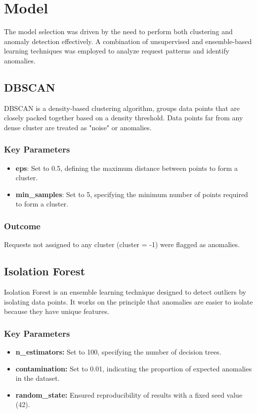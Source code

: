 \section{Model}
The model selection was driven by the need to perform both clustering and anomaly detection effectively. A combination of unsupervised and ensemble-based learning techniques was employed to analyze request patterns and identify anomalies.

\subsection{DBSCAN}
DBSCAN is a density-based clustering algorithm, groups data points that are closely packed together based on a density threshold. Data points far from any dense cluster are treated as "noise" or anomalies.


\subsubsection{Key Parameters}
\begin{itemize}
	\item \textbf{eps}: Set to 0.5, defining the maximum distance between points to form a cluster.
	\item \textbf{min\_samples}: Set to 5, specifying the minimum number of points required to form a cluster.
\end{itemize}
\subsubsection{Outcome}
Requests not assigned to any cluster (cluster = -1) were flagged as anomalies.

\subsection{Isolation Forest}
Isolation Forest is an ensemble learning technique designed to detect outliers by isolating data points. It works on the principle that anomalies are easier to isolate because they have unique features.
\subsubsection{Key Parameters}
\begin{itemize}
	\item \textbf{n\_estimators:} Set to 100, specifying the number of decision trees.
	\item \textbf{contamination:} Set to 0.01, indicating the proportion of expected anomalies in the dataset.
	\item \textbf{random\_state:} Ensured reproducibility of results with a fixed seed value (42).
\end{itemize}
